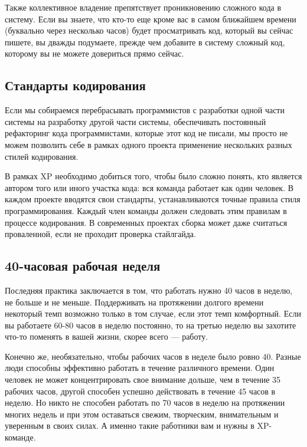 \documentclass{../../text-style}
\begin{document}
Также коллективное владение препятствует проникновению сложного кода в систему. Если вы знаете, что кто-то еще кроме вас в самом ближайшем времени (буквально через несколько часов) будет просматривать код, который вы сейчас пишете, вы дважды подумаете, прежде чем добавите в систему сложный код, которому вы не можете довериться прямо сейчас. 

\subsection{Стандарты кодирования}

Если мы собираемся перебрасывать программистов с разработки одной части системы на разработку другой части системы, обеспечивать постоянный рефакторинг кода программистами, которые этот код не писали, мы просто не можем позволить себе в рамках одного проекта применение нескольких разных стилей кодирования.

В рамках XP необходимо добиться того, чтобы было сложно понять, кто является автором того или иного участка кода: вся команда работает как один человек. В каждом проекте вводятся свои стандарты, устанавливаются точные правила стиля программирования. Каждый член команды должен следовать этим правилам в процессе кодирования. В современных проектах сборка может даже считаться проваленной, если не проходит проверка стайлгайда.

\subsection{40-часовая рабочая неделя}

Последняя практика заключается в том, что работать нужно 40 часов в неделю, не больше и не меньше. Поддерживать на протяжении долгого времени некоторый темп возможно только в том случае, если этот темп комфортный. Если вы работаете 60-80 часов в неделю постоянно, то на третью неделю вы захотите что-то поменять в вашей жизни, скорее всего --- работу.

Конечно же, необязательно, чтобы рабочих часов в неделе было ровно 40. Разные люди способны эффективно работать в течение различного времени. Один человек не может концентрировать свое внимание дольше, чем в течение 35 рабочих часов, другой способен успешно действовать в течение 45 часов в неделю. Но никто не способен работать по 70 часов в неделю на протяжении многих недель и при этом оставаться свежим, творческим, внимательным и уверенным в своих силах. А именно такие работники вам и нужны в XP-команде.
\end{document}

